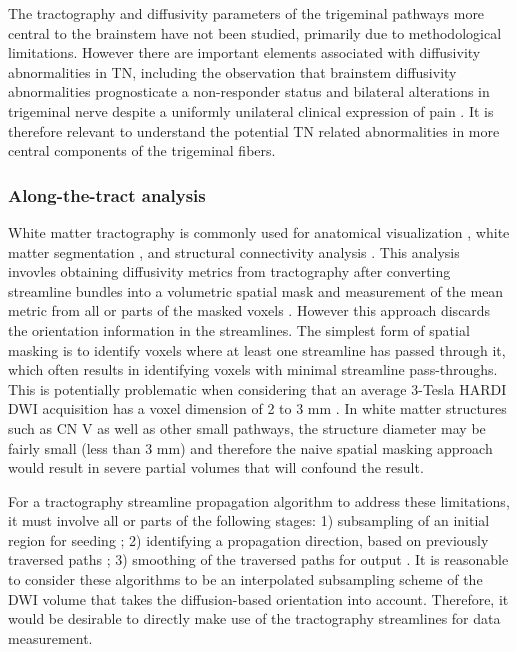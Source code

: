 The tractography and diffusivity parameters of the trigeminal pathways more central to the brainstem have not been studied, primarily due to methodological limitations. However there are important elements associated with diffusivity abnormalities in TN, including the observation that brainstem diffusivity abnormalities prognosticate a non-responder status \cite{Hung2017} and bilateral alterations in trigeminal nerve despite a uniformly unilateral clinical expression of pain \cite{Miller2009}. It is therefore relevant to understand the potential TN related abnormalities in more central components of the trigeminal fibers.  

\subsubsection{Along-the-tract analysis}
White matter tractography is commonly used for anatomical visualization \cite{Chen2011b}, white matter segmentation \cite{Behrens2003a,Johansen-Berg2005}, and structural connectivity analysis \cite{Cao2013,Wiech2014}. This analysis invovles obtaining diffusivity metrics from tractography after converting streamline bundles into a volumetric spatial mask and measurement of the mean metric from all or parts of the masked voxels \cite{Concha2005,Fitzsimmons2009}. However this approach discards the orientation information in the streamlines. The simplest form of spatial masking is to identify voxels where at least one streamline has passed through it, which often results in identifying voxels with minimal streamline pass-throughs. This is potentially problematic when considering that an average 3-Tesla HARDI DWI acquisition has a voxel dimension of 2 to 3 mm \cite{Neher2015,Wilkins2015}. In white matter structures such as CN V as well as other small pathways, the structure diameter may be fairly small (less than 3 mm) and therefore the naive spatial masking approach would result in severe partial volumes that will confound the result. 

For a tractography streamline propagation algorithm to address these limitations, it must involve all or parts of the following stages: 1) subsampling of an initial region for seeding \cite{Basser2002,Cote2012}; 2) identifying a propagation direction, based on previously traversed paths \cite{Malcolm2010,Qazi2009,Tournier2010}; 3) smoothing of the traversed paths for output \cite{Tuch2000d}. It is reasonable to consider these algorithms to be an interpolated subsampling scheme of the DWI volume that takes the diffusion-based orientation into account. Therefore, it would be desirable to directly make use of the tractography streamlines for data measurement. 

